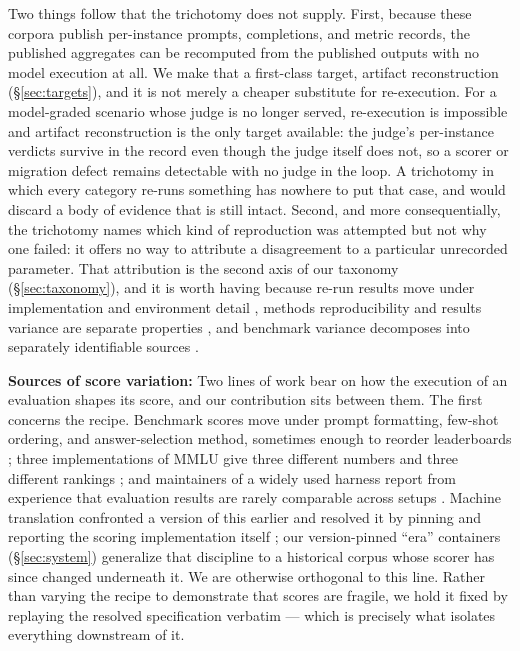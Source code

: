 Two things follow that the trichotomy does not supply. First, because these corpora publish per-instance prompts, completions, and metric records, the published aggregates can be recomputed from the published outputs with no model execution at all. We make that a first-class target, artifact reconstruction (\S\ref{sec:targets}), and it is not merely a cheaper substitute for re-execution. For a model-graded scenario whose judge is no longer served, re-execution is impossible and artifact reconstruction is the only target available: the judge's per-instance verdicts survive in the record even though the judge itself does not, so a scorer or migration defect remains detectable with no judge in the loop. A trichotomy in which every category re-runs something has nowhere to put that case, and would discard a body of evidence that is still intact. Second, and more consequentially, the trichotomy names which kind of reproduction was attempted but not why one failed: it offers no way to attribute a disagreement to a particular unrecorded parameter. That attribution is the second axis of our taxonomy (\S\ref{sec:taxonomy}), and it is worth having because re-run results move under implementation and environment detail \citep{pineau2021checklist,dodge2019show}, methods reproducibility and results variance are separate properties \citep{bouthillier2019unreproducible}, and benchmark variance decomposes into separately identifiable sources \citep{bouthillier2021variance}.

\textbf{Sources of score variation:} Two lines of work bear on how the execution of an evaluation shapes its score, and our contribution sits between them. The first concerns the recipe. Benchmark scores move under prompt formatting, few-shot ordering, and answer-selection method, sometimes enough to reorder leaderboards \citep{sclar2024quantifying,mizrahi2024state,alzahrani2024targets}; three implementations of MMLU give three different numbers and three different rankings \citep{hfleaderboard2023mmlu}; and maintainers of a widely used harness report from experience that evaluation results are rarely comparable across setups \citep{biderman2024lessons}. Machine translation confronted a version of this earlier and resolved it by pinning and reporting the scoring implementation itself \citep{post2018clarity}; our version-pinned ``era'' containers (\S\ref{sec:system}) generalize that discipline to a historical corpus whose scorer has since changed underneath it. We are otherwise orthogonal to this line. Rather than varying the recipe to demonstrate that scores are fragile, we hold it fixed by replaying the resolved specification verbatim --- which is precisely what isolates everything downstream of it.


